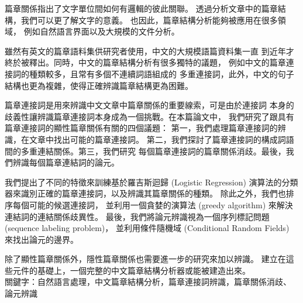 \begin{abstractzh}

篇章關係指出了文字單位間如何有邏輯的彼此關聯。
透過分析文章中的篇章結構，我們可以更了解文字的意義。
也因此，篇章結構分析能夠被應用在很多領域，
例如自然語言界面以及大規模的文件分析。

雖然有英文的篇章語料集供研究者使用，中文的大規模語篇資料集一直
到近年才終於被釋出。同時，中文的篇章結構分析有很多獨特的議題，
例如中文的篇章連接詞的種類較多，且常有多個不連續詞語組成的
多重連接詞，此外，中文的句子結構也更為複雜，使得正確辨識篇章結構更為困難。

篇章連接詞是用來辨識中文文章中篇章關係的重要線索，可是由於連接詞
本身的歧義性讓辨識篇章連接詞本身成為一個挑戰。在本篇論文中，
我們研究了跟具有篇章連接詞的顯性篇章關係有關的四個議題：
第一，我們處理篇章連接詞的辨識，在文章中找出可能的篇章連接詞。
第二，我們探討了篇章連接詞的構成詞語間的多重連結關係。第三，我們研究
每個篇章連接詞的篇章關係消歧。最後，我們辨識每個篇章連結詞的論元。

我們提出了不同的特徵來訓練基於羅吉斯迴歸 (Logistic Regression)
演算法的分類器來識別正確的篇章連接詞，以及辨識其篇章關係的種類。
除此之外，我們也排序每個可能的候選連接詞，
並利用一個貪婪的演算法 (greedy algorithm) 來解決連結詞的連結關係歧異性。
最後，我們將論元辨識視為一個序列標記問題 (sequence labeling problem)，
並利用條件隨機域 (Conditional Random Fields) 來找出論元的邊界。

除了顯性篇章關係外，隱性篇章關係也需要進一步的研究來加以辨識。
建立在這些元件的基礎上，一個完整的中文篇章結構分析器或能被建造出來。 \\

\noindent
關鍵字：自然語言處理，中文篇章結構分析，篇章連接詞辨識，篇章關係消歧、
論元辨識

\end{abstractzh}

